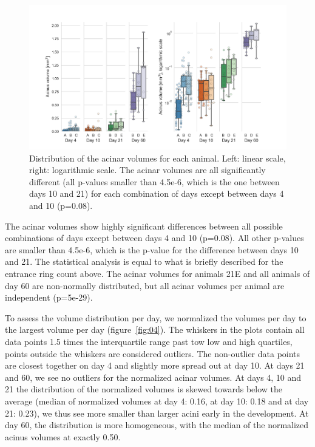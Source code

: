 \documentclass[
  american,
]{article}
\begin{document}
\begin{figure}
\hypertarget{fig:03}{%
\centering
\includegraphics{images/fig03.png}
\caption{Distribution of the acinar volumes for each animal.
Left: linear scale, right: logarithmic scale.
The acinar volumes are all significantly different (all p-values smaller than 4.5e-6, which is the one between days 10 and 21) for each combination of days except between days 4 and 10 (p=0.08).}\label{fig:03}
}
\end{figure}

The acinar volumes show highly significant differences between all possible combinations of days except between days 4 and 10 (p=0.08).
All other p-values are smaller than 4.5e-6, which is the p-value for the difference between days 10 and 21.
The statistical analysis is equal to what is briefly described for the entrance ring count above.
The acinar volumes for animals 21E and all animals of day 60 are non-normally distributed, but all acinar volumes per animal are independent (p=5e-29).

To assess the volume distribution per day, we normalized the volumes per day to the largest volume per day (figure~\ref{fig:04}).
The whiskers in the plots contain all data points 1.5 times the interquartile range past tow low and high quartiles, points outside the whiskers are considered outliers.
The non-outlier data points are closest together on day 4 and slightly more spread out at day 10.
At days 21 and 60, we see no outliers for the normalized acinar volumes.
At days 4, 10 and 21 the distribution of the normalized volumes is skewed towards below the average (median of normalized volumes at day 4: 0.16, at day 10: 0.18 and at day 21: 0.23), we thus see more smaller than larger acini early in the development.
At day 60, the distribution is more homogeneous, with the median of the normalized acinus volumes at exactly 0.50.
\end{document}
